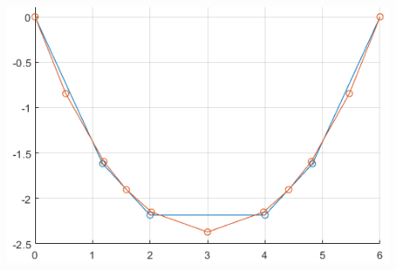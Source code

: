 \documentclass[A4paper, 11pt]{article}
\begin{document}
\begin{figure}[h]
\centering
\includegraphics[scale=0.8]{liha_in_soda}
\end{figure}

\newpage
\end{document}
